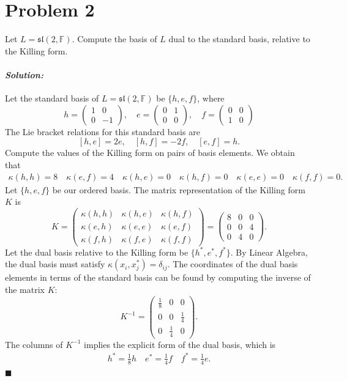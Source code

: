 \documentclass[12pt, a4paper]{article}
\newenvironment{solution}
  {\paragraph{\textit{Solution:}}\par\medskip}
  {\hfill$\blacksquare$\vspace{0.1cm}}
\begin{document}
\section*{Problem 2}
Let $L = \mathfrak{sl}(2, \mathbb{F})$. Compute the basis of $L$ dual to the standard basis, relative to the Killing form.
\begin{solution}
  Let the standard basis of $L = \mathfrak{sl}(2, \mathbb{F})$ be $\{h, e, f\}$, where
  $$h = \begin{pmatrix} 1 & 0 \\ 0 & -1 \end{pmatrix}, \quad e = \begin{pmatrix} 0 & 1 \\ 0 & 0 \end{pmatrix}, \quad f = \begin{pmatrix} 0 & 0 \\ 1 & 0 \end{pmatrix}$$
  The Lie bracket relations for this standard basis are 
  $$[h, e] = 2e, \quad [h, f] = -2f, \quad [e, f] = h.$$
  Compute the values of the Killing form on pairs of basis elements. We obtain that 
  \begin{align*}
    \kappa(h, h) = 8\quad \kappa(e, f)  = 4\quad \kappa(h, e) = 0\quad \kappa(h, f) = 0\quad \kappa(e, e) = 0
    \quad \kappa(f, f) = 0.
  \end{align*}
  Let $\{h, e, f\}$ be our ordered basis. The matrix representation of the Killing form $K$ is $$K = \begin{pmatrix} \kappa(h,h) & \kappa(h,e) & \kappa(h,f) \\ \kappa(e,h) & \kappa(e,e) & \kappa(e,f) \\ \kappa(f,h) & \kappa(f,e) & \kappa(f,f) \end{pmatrix} = \begin{pmatrix} 8 & 0 & 0 \\ 0 & 0 & 4 \\ 0 & 4 & 0 \end{pmatrix}.$$
  Let the dual basis relative to the Killing form be $\{h^*, e^*, f^*\}$. 
  By Linear Algebra, the dual basis must satisfy $\kappa(x_i, x_j^*) = \delta_{ij}$. The coordinates of the dual basis elements in terms of the standard basis can be found by computing the inverse of the matrix $K$:$$K^{-1} = \begin{pmatrix} \frac{1}{8} & 0 & 0 \\ 0 & 0 & \frac{1}{4} \\ 0 & \frac{1}{4} & 0 \end{pmatrix}.$$
  The columns of $K^{-1}$ implies the explicit form of the dual basis, which is 
  \begin{align*}
    h^* = \frac{1}{8}h \quad e^* = \frac{1}{4}f \quad f^* = \frac{1}{4}e.
  \end{align*}
\end{solution}
\end{document}
